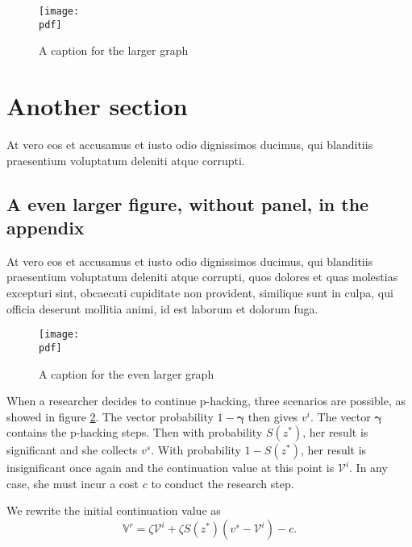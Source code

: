 \documentclass[letterpaper,12pt,leqno]{article}
\newcommand{\pdf}{figures.pdf}
\begin{document}
\begin{figure}[t]
\texttt{[image: \\pdf]}
\caption{A caption for the larger graph}
\label{f:appendix1}\end{figure}

\section{Another section}\label{a:appendix2}

At vero eos et accusamus et iusto odio dignissimos ducimus, qui blanditiis praesentium voluptatum deleniti atque corrupti.

\subsection{A even larger figure, without panel, in the appendix} 

At vero eos et accusamus et iusto odio dignissimos ducimus, qui blanditiis praesentium voluptatum deleniti atque corrupti, quos dolores et quas molestias excepturi sint, obcaecati cupiditate non provident, similique sunt in culpa, qui officia deserunt mollitia animi, id est laborum et dolorum fuga. 

\begin{figure}[t]
\texttt{[image: \\pdf]}
\caption{A caption for the even larger graph}
\label{f:appendix2}\end{figure}

When a researcher decides to continue p-hacking, three scenarios are possible, as showed in figure \ref{f:appendix2}. The vector probability $1-\bm{\gamma}$ then gives $v^i$. The vector $\bm{\gamma}$ contains the p-hacking steps. Then with probability $S(z^*)$, her result is significant and she collects $v^s$. With probability $1-S(z^*)$, her result is insignificant once again and the continuation value at this point is $\mathcal{V}^i$. In any case, she must incur a cost $c$ to conduct the research step. 

We rewrite the initial continuation value as
\begin{equation}
\mathbb{V}^r = \zeta \mathcal{V}^i + \zeta S(z^*) (v^s - \mathcal{V}^i) - c.
\label{e:appendix2}\end{equation}
\end{document}
